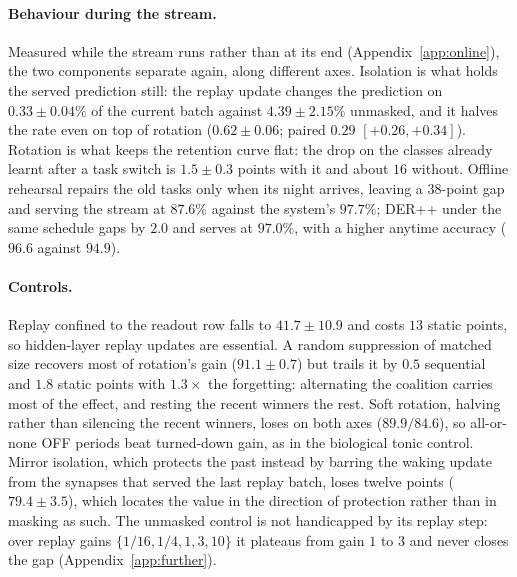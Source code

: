 \documentclass{article}
\begin{document}
\paragraph{Behaviour during the stream.} Measured while the stream runs rather than at its
end (Appendix~\ref{app:online}), the two components separate again, along different axes.
Isolation is what holds the served prediction still: the replay update changes the
prediction on $0.33\pm0.04\%$ of the current batch against $4.39\pm2.15\%$ unmasked, and it
halves the rate even on top of rotation ($0.62\pm0.06$; paired $0.29$ $[+0.26,+0.34]$).
Rotation is what keeps the retention curve flat: the drop on the classes already learnt
after a task switch is $1.5\pm0.3$ points with it and about $16$ without. Offline rehearsal
repairs the old tasks only when its night arrives, leaving a $38$-point gap and serving the
stream at $87.6\%$ against the system's $97.7\%$; DER++ under the same schedule gaps by
$2.0$ and serves at $97.0\%$, with a higher anytime accuracy ($96.6$ against $94.9$).

\paragraph{Controls.} Replay confined to the readout row falls to $41.7\pm10.9$ and costs
$13$ static points, so hidden-layer replay updates are essential. A random suppression of
matched size recovers most of rotation's gain ($91.1\pm0.7$) but trails it by $0.5$
sequential and $1.8$ static points with $1.3\times$ the forgetting: alternating the coalition
carries most of the effect, and resting the recent winners the rest. Soft rotation, halving
rather than silencing the recent winners, loses on both axes ($89.9/84.6$), so all-or-none
OFF periods beat turned-down gain, as in the biological tonic control. Mirror isolation,
which protects the past instead by barring the waking update from the synapses that served
the last replay batch, loses twelve points ($79.4\pm3.5$), which locates the value in the
direction of protection rather than in masking as such. The unmasked control is not
handicapped by its replay step: over replay gains $\{1/16,1/4,1,3,10\}$ it plateaus from
gain $1$ to $3$ and never closes the gap (Appendix~\ref{app:further}).
\end{document}
